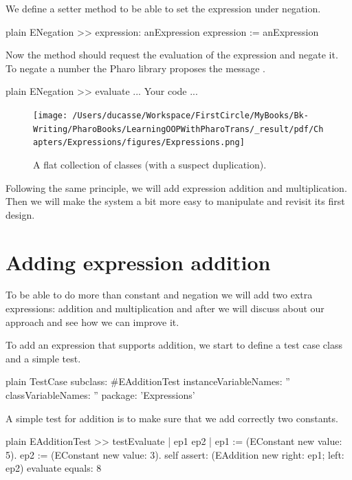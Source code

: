 \documentclass[10pt,twoside,english]{_support/latex/sbabook/sbabook}
\begin{document}
We define a setter method to be able to set the expression under negation.

\begin{displaycode}{plain}
ENegation >> expression: anExpression 
	expression := anExpression
\end{displaycode}

Now the  method should request the evaluation of the expression and negate it. 
To negate a number the Pharo library proposes the message . 

\begin{displaycode}{plain}
ENegation >> evaluate
	... Your code ...
\end{displaycode}


\begin{figure}

\begin{center}
\texttt{[image: /Users/ducasse/Workspace/FirstCircle/MyBooks/Bk-Writing/PharoBooks/LearningOOPWithPharoTrans/\_result/pdf/Chapters/Expressions/figures/Expressions.png]}\caption{A flat collection of classes (with a suspect duplication).\label{figExpression}}\end{center}
\end{figure}


Following the same principle, we will add expression addition and multiplication. Then we will make the system a bit more easy to manipulate and revisit its first design. 
\section{Adding expression addition}
To be able to do more than constant and negation we will add two extra expressions: addition and multiplication and after we will discuss about our approach and see how we can improve it.  

To add an expression that supports addition, we start to define a test case class and a simple test. 

\begin{displaycode}{plain}
TestCase subclass: #EAdditionTest
	instanceVariableNames: ''
	classVariableNames: ''
	package: 'Expressions'
\end{displaycode}

A simple test for addition is to make sure that we add correctly two constants. 

\begin{displaycode}{plain}
EAdditionTest >> testEvaluate
	| ep1 ep2 |
	ep1 := (EConstant new value: 5).
	ep2 := (EConstant new value: 3).
	self assert: (EAddition new right: ep1; left: ep2) evaluate equals: 8
\end{displaycode}
\end{document}
